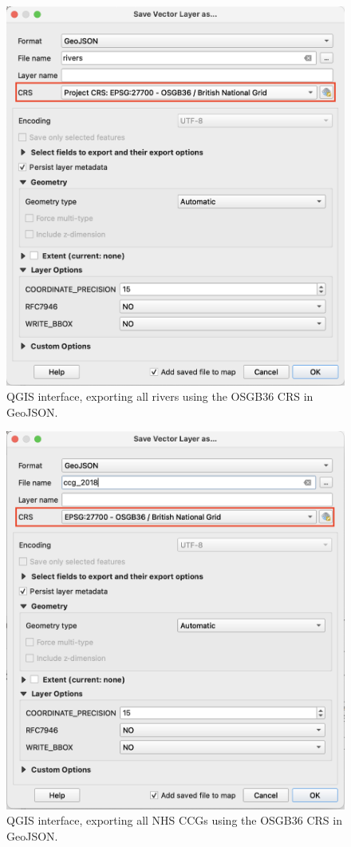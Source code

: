 \documentclass[Afour,sagev,times]{sagej}
\begin{document}
{
\begin{figure}[H]
    \centering
    \includegraphics[width=\columnwidth]{export_rivers.png}
    \caption{QGIS interface, exporting all rivers using the OSGB36 CRS in GeoJSON.}
    \label{fig:export_rivers}
\end{figure}

\begin{figure}[H]
    \centering
    \includegraphics[width=\columnwidth]{export_ccgs.png}
    \caption{QGIS interface, exporting all NHS CCGs using the OSGB36 CRS in GeoJSON.}
    \label{fig:export_ccgs}
\end{figure}

}
\end{document}
